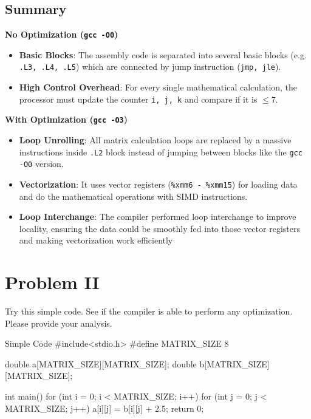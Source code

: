 \documentclass[12pt, a4paper]{article}
\begin{document}
    \pagebreak

            \subsection{Summary}

                \noindent \textbf{No Optimization (\texttt{gcc -O0})}
                \begin{itemize}
                    \item \textbf{Basic Blocks}: The assembly code is separated into several basic blocks
                    (e.g. \texttt{.L3, .L4, .L5}) which are connected by jump instruction (\texttt{jmp, jle}).
                    \item \textbf{High Control Overhead}: For every single mathematical calculation, the processor
                    must update the counter \texttt{i, j, k} and compare if it is $\leq 7$.
                \end{itemize}

                \noindent \textbf{With Optimization (\texttt{gcc -O3})}
                \begin{itemize}
                    \item \textbf{Loop Unrolling}: All matrix calculation loops are replaced by a massive instructions
                    inside \texttt{.L2} block instead of jumping between blocks like the \texttt{gcc -O0} version.
                    \item \textbf{Vectorization}: It uses vector registers (\texttt{\%xmm6 - \%xmm15}) for loading
                    data and do the mathematical operations with SIMD instructions.
                    \item \textbf{Loop Interchange}: The compiler performed loop interchange to improve locality,
                    ensuring the data could be smoothly fed into those vector registers and making vectorization work efficiently
                \end{itemize}

    \pagebreak

    \section{Problem II}
        Try this simple code. See if the compiler is able to perform any optimization.
        Please provide your analysis.
        \begin{codeblock}[minted language=c]{Simple Code}
            #include<stdio.h>
            #define MATRIX_SIZE 8

            double a[MATRIX_SIZE][MATRIX_SIZE];
            double b[MATRIX_SIZE][MATRIX_SIZE];

            int main() {
                for (int i = 0; i < MATRIX_SIZE; i++) {
                    for (int j = 0; j < MATRIX_SIZE; j++) {
                        a[i][j] = b[i][j] + 2.5;
                    }
                }
                return 0;
            }
        \end{codeblock}
\end{document}
